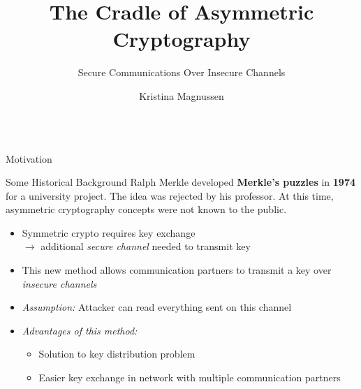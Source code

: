 \documentclass[final]{beamer}
\title{The Cradle of Asymmetric Cryptography}
\subtitle{Secure Communications Over Insecure Channels}
\author{Kristina Magnussen}
\begin{document}
\begin{frame}[fragile]
\begin{columns}[t]


\begin{leftcolumn}

   \begin{boxblock}{Motivation}
   	\justifying
   	 \begin{alertblock}{Some Historical Background}
   	 	\justifying
   		   	Ralph Merkle developed \textbf{Merkle's puzzles} in \textbf{1974} for a university project. The idea was rejected by his professor. At this time, asymmetric cryptography concepts were not known to the public. 
   	\end{alertblock}

     \begin{itemize}
     	\item Symmetric crypto requires key exchange \\ $\rightarrow$ additional \emph{secure channel} needed to transmit key
     	\item This new method allows communication partners to transmit a key over \emph{insecure channels} 
     	\item \emph{Assumption:} Attacker can read everything sent on this channel
     	\item \emph{Advantages of this method:}
     	\begin{itemize}
     		\item Solution to key distribution problem
     		\item Easier key exchange in network with multiple communication partners 
     	\end{itemize}
     \end{itemize}


\end{boxblock}
\end{leftcolumn}
\end{columns}
\end{frame}
\end{document}
